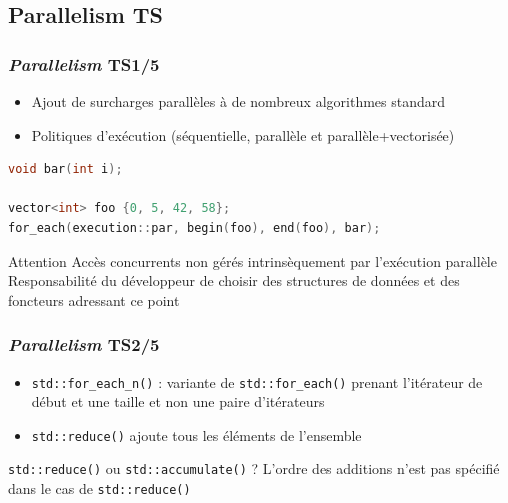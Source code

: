 \documentclass[C++.tex]{subfiles}
\begin{document}
\subsection*{Parallelism TS}
\begin{frame}[fragile]
	\frametitle{\textit{Parallelism} TS\titlehfill{}1/5}
	\begin{itemize}
		\item Ajout de surcharges \og parallèles\fg{} à de nombreux algorithmes standard
		\item Politiques d'exécution (séquentielle, parallèle et parallèle+vectorisée)
	\end{itemize}

	\begin{lstlisting}[language=C++]
void bar(int i);

vector<int> foo {0, 5, 42, 58};
for_each(execution::par, begin(foo), end(foo), bar);\end{lstlisting}

	\begin{alertblock}{Attention}
		Accès concurrents non gérés intrinsèquement par l'exécution parallèle\\
		Responsabilité du développeur de choisir des structures de données et des foncteurs adressant ce point
	\end{alertblock}
\end{frame}

\begin{frame}[fragile]
	\frametitle{\textit{Parallelism} TS\titlehfill{}2/5}
	\begin{itemize}
		\item \lstinline|std::for_each_n()| : variante de \lstinline|std::for_each()| prenant l'itérateur de début et une taille et non une paire d'itérateurs


		\item \lstinline|std::reduce()| \og ajoute\fg{} tous les éléments de l'ensemble
	\end{itemize}

	\begin{block}{\lstinline|std::reduce()| ou \lstinline|std::accumulate()| ?}
		L'ordre des \og additions\fg{} n'est pas spécifié dans le cas de \lstinline|std::reduce()|

	\end{block}
\end{frame}
\end{document}
